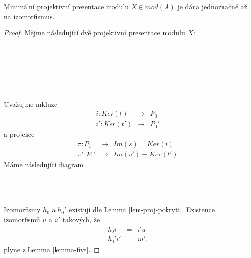      \begin{lem} 
       Minimální projektivní prezentace modulu $X\in mod(A)$ je dána jednoznačně 
       až na izomorfismus.
     \end{lem}
     \begin{proof}
      Mějme následující dvě projektivní prezentace modulu $X$:\\\\
       \centerline{}\\\\
       \centerline{}\\\\
      Uvažujme inkluze
      \begin{eqnarray}
          i:Ker(t) &\to& P_0 \nonumber \\
         i':Ker(t') &\to& P_0' \nonumber 
      \end{eqnarray}
      a projekce
      \begin{eqnarray}
          \pi:P_1 &\to& Im(s)=Ker(t) \nonumber \\
          \pi':P_1' &\to& Im(s')=Ker(t') \nonumber 
      \end{eqnarray}
       Máme následující diagram:
      \\\\      
      \centerline{}\\\\ 
      Izomorfismy $h_0$ a $h_0'$ existují dle 
      \hyperref[lem-proj-pokryti]{Lemma \ref*{lem-proj-pokryti}}. Existence 
      izomorfismů $u$ a $u'$ takových, že 
      \begin{eqnarray}
        h_0i &=& i'u \nonumber \\
        h_0'i'&=&iu'.  \nonumber
      \end{eqnarray}
      plyne z \hyperref[lemma-five]{Lemma \ref*{lemma-five}}.
      

\end{proof}

